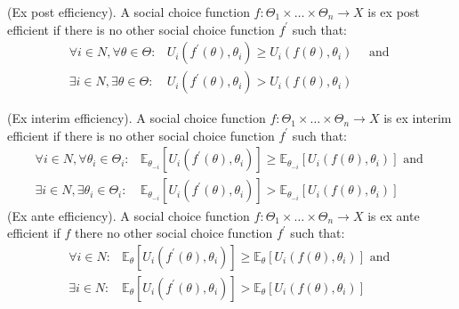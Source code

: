 (Ex post efficiency). A social choice function $f: \Theta_{1} \times \ldots \times \Theta_{n} \rightarrow X$ is ex post efficient if there is no other social choice function $f^{\prime}$ such that:
$$
\begin{array}{ll}
\forall i \in N, \forall \theta \in \Theta: & U_{i}\left(f^{\prime}(\theta), \theta_{i}\right) \geqslant U_{i}\left(f(\theta), \theta_{i}\right) \quad \text { and } \\
\exists i \in N, \exists \theta \in \Theta: & U_{i}\left(f^{\prime}(\theta), \theta_{i}\right)>U_{i}\left(f(\theta), \theta_{i}\right)
\end{array}
$$

(Ex interim efficiency). A social choice function $f: \Theta_{1} \times \ldots \times \Theta_{n} \rightarrow X$ is ex interim efficient if there is no other social choice function $f^{\prime}$ such that:
$$
\begin{array}{ll}
\forall i \in N, \forall \theta_{i} \in \Theta_{i}: & \mathbb{E}_{\theta_{-i}}\left[U_{i}\left(f^{\prime}(\theta), \theta_{i}\right)\right] \geqslant \mathbb{E}_{\theta_{-i}}\left[U_{i}\left(f(\theta), \theta_{i}\right)\right] \text { and } \\
\exists i \in N, \exists \theta_{i} \in \Theta_{i}: & \mathbb{E}_{\theta_{-i}}\left[U_{i}\left(f^{\prime}(\theta), \theta_{i}\right)\right]>\mathbb{E}_{\theta_{-i}}\left[U_{i}\left(f(\theta), \theta_{i}\right)\right]
\end{array}
$$
(Ex ante efficiency). A social choice function $f: \Theta_{1} \times \ldots \times \Theta_{n} \rightarrow X$ is ex ante efficient if $f$ there no other social choice function $f^{\prime}$ such that:
$$
\begin{array}{ll}
\forall i \in N: & \mathbb{E}_{\theta}\left[U_{i}\left(f^{\prime}(\theta), \theta_{i}\right)\right] \geqslant \mathbb{E}_{\theta}\left[U_{i}\left(f(\theta), \theta_{i}\right)\right] \text { and } \\
\exists i \in N: & \mathbb{E}_{\theta}\left[U_{i}\left(f^{\prime}(\theta), \theta_{i}\right)\right]>\mathbb{E}_{\theta}\left[U_{i}\left(f(\theta), \theta_{i}\right)\right]
\end{array}
$$

